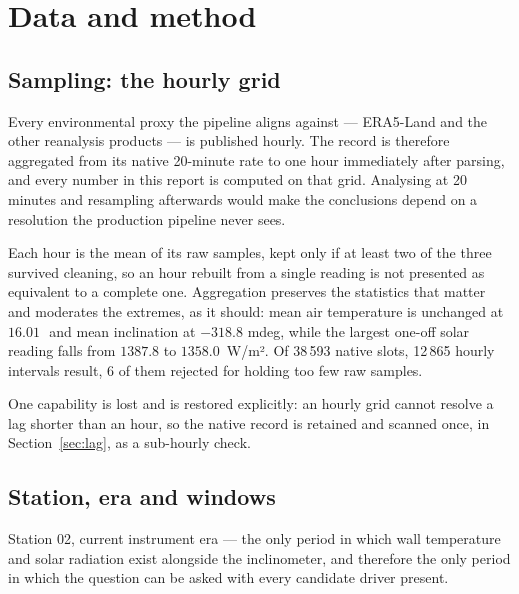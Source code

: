 \documentclass[11pt,a4paper]{article}
\begin{document}
\section{Data and method}

\subsection{Sampling: the hourly grid}

Every environmental proxy the pipeline aligns against --- ERA5-Land and the other
reanalysis products --- is published hourly. The record is therefore aggregated from
its native 20-minute rate to one hour immediately after parsing, and every number in
this report is computed on that grid. Analysing at 20 minutes and resampling afterwards
would make the conclusions depend on a resolution the production pipeline never sees.

Each hour is the mean of its raw samples, kept only if at least two of the three
survived cleaning, so an hour rebuilt from a single reading is not presented as
equivalent to a complete one. Aggregation preserves the statistics that matter and
moderates the extremes, as it should: mean air temperature is unchanged at
$16.01$\,\degC\ and mean inclination at $-318.8$ mdeg, while the largest one-off solar
reading falls from $1387.8$ to $1358.0$~W/m². Of 38\,593 native slots, 12\,865 hourly
intervals result, 6 of them rejected for holding too few raw samples.

One capability is lost and is restored explicitly: an hourly grid cannot resolve a lag
shorter than an hour, so the native record is retained and scanned once, in
Section~\ref{sec:lag}, as a sub-hourly check.

\subsection{Station, era and windows}

Station 02, current instrument era --- the only period in which wall temperature and
solar radiation exist alongside the inclinometer, and therefore the only period in
which the question can be asked with every candidate driver present.
\end{document}
